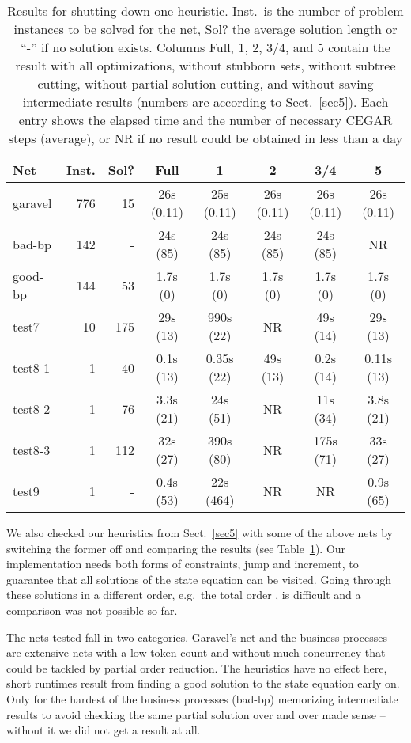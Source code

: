 \documentclass{LMCS}
\begin{document}
\begin{table}[tb]
\centering\small
\begin{tabular}{|l|r|r|c|c|c|c|c|}\hline
Net & Inst. & Sol? & Full & 1 & 2 & 3/4 & 5\\\hline
garavel & 776 & 15 & 26s (0.11) & 25s (0.11) & 26s (0.11) & 26s (0.11) & 26s (0.11)\\\hline
bad-bp & 142 & - & 24s (85) & 24s (85) & 24s (85) & 24s (85) & NR\\\hline
good-bp & 144 & 53 & 1.7s (0) & 1.7s (0) & 1.7s (0) & 1.7s (0) & 1.7s (0)\\\hline
test7 & 10 & 175 & 29s (13) & 990s (22) & NR & 49s (14) & 29s (13)\\\hline
test8-1 & 1 & 40 & 0.1s (13) & 0.35s (22) & 49s (13) & 0.2s (14) & 0.11s (13)\\\hline
test8-2 & 1 & 76 & 3.3s (21) & 24s (51) & NR & 11s (34) & 3.8s (21)\\\hline
test8-3 & 1 & 112 & 32s (27) & 390s (80) & NR & 175s (71) & 33s (27)\\\hline
test9 & 1 & - & 0.4s (53) & 22s (464) & NR & NR & 0.9s (65)\\\hline
\end{tabular}\vspace*{2mm}
\caption{\label{t.1}Results for shutting down one heuristic. Inst.\ is the number of problem
instances to be solved for the net, Sol? the average solution length or ``-'' if no solution
exists. Columns Full, 1, 2, 3/4, and 5 contain the result
with all optimizations, without stubborn sets, without
subtree cutting, without partial solution cutting, and without saving intermediate results 
(numbers are according to Sect.~\ref{sec5}).
Each entry shows the elapsed time and the number of necessary CEGAR steps (average), or
NR if no result could be obtained in less than a day}
\end{table}

We also checked our heuristics from Sect.~\ref{sec5} with some of the above nets by switching
the former off and comparing the results (see Table~\ref{t.1}). Our implementation needs both forms of constraints,
jump and increment, to guarantee that all solutions of the state equation can be visited.
Going through these solutions in a different order, e.g.\ the total order , is difficult
and a comparison was not possible so far.

The nets tested fall in two categories. Garavel's net 
and the business processes are extensive nets with a low token count and without much
concurrency that could be tackled by partial order reduction. The heuristics have no effect
here, short runtimes result from finding a good solution to the state equation early on.
Only for the hardest of the business processes (bad-bp) memorizing intermediate results
to avoid checking the same partial solution over and over made sense -- without it we did not get
a result at all.
\end{document}
